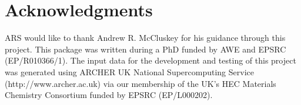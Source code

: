 \documentclass[journal=jacsat,manuscript=article]{achemso}
\begin{document}
\section{Acknowledgments}

ARS would like to thank Andrew R. McCluskey for his guidance through this project. This package was written during a PhD funded by AWE and EPSRC (EP/R010366/1). The input
data for the development and testing of this project was generated using ARCHER UK National Supercomputing Service (http://www.archer.ac.uk) via our membership of 
the UK's HEC Materials Chemistry Consortium funded by EPSRC (EP/L000202). 


\end{document}
